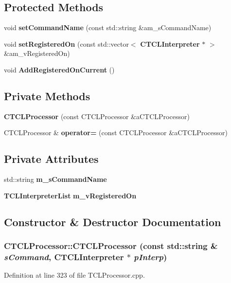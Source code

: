 \subsection*{Protected Methods}
\begin{CompactItemize}
\item 
void {\bf set\-Command\-Name} (const std::string \&am\_\-s\-Command\-Name)
\item 
void {\bf set\-Registered\-On} (const std::vector$<$ {\bf CTCLInterpreter} $\ast$ $>$ \&am\_\-v\-Registered\-On)
\item 
void {\bf Add\-Registered\-On\-Current} ()
\end{CompactItemize}
\subsection*{Private Methods}
\begin{CompactItemize}
\item 
{\bf CTCLProcessor} (const CTCLProcessor \&a\-CTCLProcessor)
\item 
CTCLProcessor \& {\bf operator=} (const CTCLProcessor \&a\-CTCLProcessor)
\end{CompactItemize}
\subsection*{Private Attributes}
\begin{CompactItemize}
\item 
std::string {\bf m\_\-s\-Command\-Name}
\item 
{\bf TCLInterpreter\-List} {\bf m\_\-v\-Registered\-On}
\end{CompactItemize}


\subsection{Constructor \& Destructor Documentation}
\subsubsection{\setlength{\rightskip}{0pt plus 5cm}CTCLProcessor::CTCLProcessor (const std::string \& {\em s\-Command}, {\bf CTCLInterpreter} $\ast$ {\em p\-Interp})}\label{classCTCLProcessor_a0}




Definition at line 323 of file TCLProcessor.cpp.

